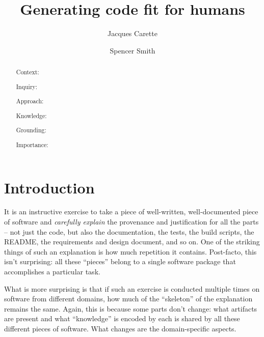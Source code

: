 \documentclass[english,submission]{programming}
\begin{document}
\title{Generating code fit for humans} %

\author[a]{Jacques Carette}
\author[a]{Spencer Smith}




\maketitle

\begin{abstract}
  Context:

  Inquiry:

  Approach:

  Knowledge:

  Grounding:

  Importance:

\end{abstract}

\section{Introduction}
\label{sec:intro}

It is an instructive exercise to take a piece of well-written, well-documented
piece of software and \emph{carefully explain} the provenance and justification
for all the parts -- not just the code, but also the documentation, the tests, the
build scripts, the README, the requirements and design document, and so on.
One of the striking things of such an explanation is how much repetition it contains.
Post-facto, this isn't surprising: all these ``pieces'' belong to a single software
package that accomplishes a particular task.

What is more surprising is that if such an exercise is conducted multiple times
on software from different domains, how much of the ``skeleton'' of the explanation
remains the same. Again, this is because some parts don't change: what artifacts
are present and what ``knowledge'' is encoded by each is shared by all these different
pieces of software. What changes are the domain-specific aspects.
\end{document}
